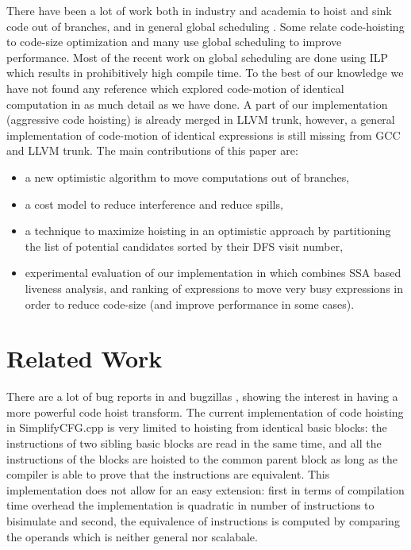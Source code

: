 \documentclass[acmlarge,review]{acmart}\settopmatter{printfolios=true}
\begin{document}
There have been a lot of work both in industry and academia to hoist and sink
code out of branches, and in general global scheduling
\cite{click1995global}. Some relate code-hoisting to code-size optimization
\cite{rosen1988global} and many \cite{barany2013, shobaki2013} use global
scheduling to improve performance. Most of the recent work on global scheduling
are done using ILP which results in prohibitively high compile time. To the best
of our knowledge we have not found any reference which explored code-motion of
identical computation in as much detail as we have done. A part of our
implementation (aggressive code hoisting) is already merged in LLVM trunk,
however, a general implementation of code-motion of identical expressions is
still missing from GCC and LLVM trunk. The main contributions of this paper are:
\begin{itemize}
\item a new optimistic algorithm to move computations out of branches,
\item a cost model to reduce interference and reduce spills,
\item a technique to maximize hoisting in an optimistic approach by partitioning
  the list of potential candidates sorted by their DFS visit number,
\item experimental evaluation of our implementation in \LLVM{} which combines
  SSA based liveness analysis, and ranking of expressions to move very busy
  expressions in order to reduce code-size (and improve performance in some
  cases).
\end{itemize}

\section{Related Work}

There are a lot of bug reports in \GCC{} and \LLVM{} bugzillas
\cite{GCCCodeHoistingBugs, LLVMCodeHoistingBugs}, showing the interest in having
a more powerful code hoist transform.  The current \LLVM{} implementation of
code hoisting in SimplifyCFG.cpp is very limited to hoisting from identical
basic blocks: the instructions of two sibling basic blocks are read in the same
time, and all the instructions of the blocks are hoisted to the common parent
block as long as the compiler is able to prove that the instructions are
equivalent.  This implementation does not allow for an easy extension: first in
terms of compilation time overhead the implementation is quadratic in number of
instructions to bisimulate and second, the equivalence of instructions is
computed by comparing the operands which is neither general nor scalabale.
\end{document}

